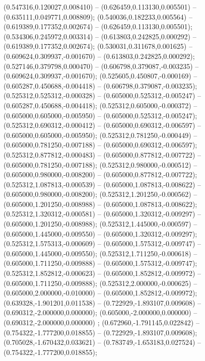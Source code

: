  (0.547316,0.120027,0.008410) -- (0.626459,0.113130,0.005501) -- (0.635111,0.049771,0.008809);
 (0.540036,0.182233,0.005564) -- (0.619389,0.177352,0.002674) -- (0.626459,0.113130,0.005501);
 (0.534306,0.245972,0.003314) -- (0.613803,0.242825,0.000292) -- (0.619389,0.177352,0.002674);
 (0.530031,0.311678,0.001625) -- (0.609624,0.309937,-0.001670) -- (0.613803,0.242825,0.000292);
 (0.527146,0.379798,0.000470) -- (0.606798,0.379087,-0.003235) -- (0.609624,0.309937,-0.001670);
 (0.525605,0.450807,-0.000169) -- (0.605287,0.450688,-0.004418) -- (0.606798,0.379087,-0.003235);
 (0.525312,0.525312,-0.000328) -- (0.605000,0.525312,-0.005247) -- (0.605287,0.450688,-0.004418);
 (0.525312,0.605000,-0.000372) -- (0.605000,0.605000,-0.005950) -- (0.605000,0.525312,-0.005247);
 (0.525312,0.690312,-0.000412) -- (0.605000,0.690312,-0.006597) -- (0.605000,0.605000,-0.005950);
 (0.525312,0.781250,-0.000449) -- (0.605000,0.781250,-0.007188) -- (0.605000,0.690312,-0.006597);
 (0.525312,0.877812,-0.000483) -- (0.605000,0.877812,-0.007722) -- (0.605000,0.781250,-0.007188);
 (0.525312,0.980000,-0.000512) -- (0.605000,0.980000,-0.008200) -- (0.605000,0.877812,-0.007722);
 (0.525312,1.087813,-0.000539) -- (0.605000,1.087813,-0.008622) -- (0.605000,0.980000,-0.008200);
 (0.525312,1.201250,-0.000562) -- (0.605000,1.201250,-0.008988) -- (0.605000,1.087813,-0.008622);
 (0.525312,1.320312,-0.000581) -- (0.605000,1.320312,-0.009297) -- (0.605000,1.201250,-0.008988);
 (0.525312,1.445000,-0.000597) -- (0.605000,1.445000,-0.009550) -- (0.605000,1.320312,-0.009297);
 (0.525312,1.575313,-0.000609) -- (0.605000,1.575312,-0.009747) -- (0.605000,1.445000,-0.009550);
 (0.525312,1.711250,-0.000618) -- (0.605000,1.711250,-0.009888) -- (0.605000,1.575312,-0.009747);
 (0.525312,1.852812,-0.000623) -- (0.605000,1.852812,-0.009972) -- (0.605000,1.711250,-0.009888);
 (0.525312,2.000000,-0.000625) -- (0.605000,2.000000,-0.010000) -- (0.605000,1.852812,-0.009972);
 (0.639328,-1.901201,0.011538) -- (0.722929,-1.893107,0.009608) -- (0.690312,-2.000000,0.000000);
 (0.605000,-2.000000,0.000000) -- (0.690312,-2.000000,0.000000) ;
 (0.672960,-1.791145,0.022842) -- (0.754322,-1.777200,0.018855) -- (0.722929,-1.893107,0.009608);
 (0.705028,-1.670432,0.033621) -- (0.783749,-1.653183,0.027524) -- (0.754322,-1.777200,0.018855);
